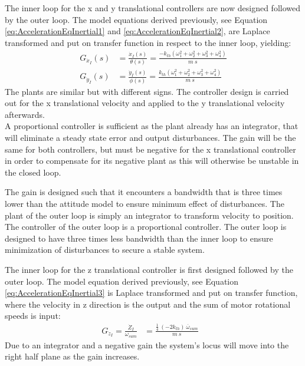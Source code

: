 The inner loop for the x and y translational controllers are now designed followed by the outer loop.
The model equations derived previously, see Equation \ref{eq:AccelerationEqInertial1} and \ref{eq:AccelerationEqInertial2}, are Laplace transformed and put on transfer function in respect to the inner loop, yielding:
\begin{align}
    G_{\dot{x}_I}(s)&=\frac{\dot{x}_I (s)}{\theta (s)}=\frac{-k_{th} (\omega_1 ^2 + \omega_2 ^2 + \omega_3 ^2 + \omega_4 ^2)}{m\ s} \\
    G_{\dot{y}_I}(s)&=\frac{\dot{y}_I (s)}{\phi (s)}=\frac{k_{th}(\omega_1 ^2 + \omega_2 ^2 + \omega_3 ^2 + \omega_4 ^2)}{m\ s} 
\end{align}
%
The plants are similar but with different signs. The controller design is carried out for the x translational velocity and applied to the y translational velocity afterwards.\\
A proportional controller is sufficient as the plant already has an integrator, that will eliminate a steady state error and output disturbances. The gain will be the same for both controllers, but must be negative for the x translational controller in order to compensate for its negative plant as this will otherwise be unstable in the closed loop.

The gain is designed such that it encounters a bandwidth that is three times lower than the attitude model to ensure minimum effect of disturbances.
The plant of the outer loop is simply an integrator to transform velocity to position. The controller of the outer loop is a proportional controller. The outer loop is designed to have three times less bandwidth than the inner loop to ensure minimization of disturbances to secure a stable system.

The inner loop for the z translational controller is first designed followed by the outer loop.
The model equation derived previously, see Equation \ref{eq:AccelerationEqInertial3} is Laplace transformed and put on transfer function, where the velocity in z direction is the output and the sum of motor rotational speeds is input:
\begin{align}
G_{\dot{z}_I}=\frac{\dot{Z}_I}{\omega_{sum}} &= \frac{ \frac{1}{4}\ (-2 k_{th})\ \overline{\omega}_{sum} }{ m\ s } & \label{eq:linearTransferFunctionZ}
\end{align}
Due to an integrator and a negative gain the system's locus will move into the right half plane as the gain increases.

